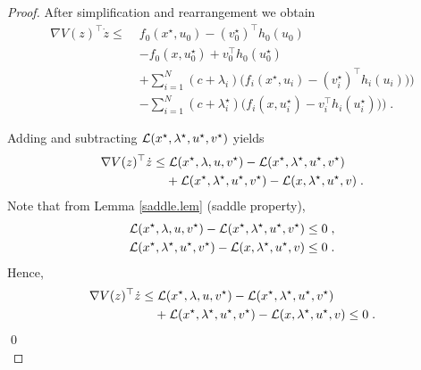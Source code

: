 \documentclass[journal,twoside,web]{ieeecolor}
\begin{document}
\begin{proof}
After simplification and rearrangement we obtain
\begin{align*}
\nabla V(z)^\top \dot z\leq \; & f_0(x^\star,u_0)-(v_0^\star)^\top
h_0(u_0)\\
&-f_0(x,u_0^\star)+v_0^\top h_0(u_0^\star)\\
&+\sum_{i=1}^N(c+\lambda_i) \Big(f_i(x^\star,u_i)-(v_i^\star)^\top h_i(u_i))\Big)\\
&-\sum_{i=1}^N(c+\lambda_i^\star) \Big(f_i(x,u_i^\star)-v_i^\top h_i(u_i^\star))\Big)\;.
\end{align*}

Adding and subtracting ${\cal L}(x^\star,\lambda^\star,u^\star,v^\star)$ yields
\begin{align} \label{deriv_v}
\nabla V(z)^\top \dot z\leq&\; {\cal L}(x^\star,\lambda,u,v^\star)-{\cal L}(x^\star,\lambda^\star,u^\star,v^\star)\\
&+{\cal L}(x^\star,\lambda^\star,u^\star,v^\star)-{\cal L}(x,\lambda^\star,u^\star,v) \;.\nonumber
\end{align}
Note that from Lemma \ref{saddle.lem} (saddle property),
\begin{align*}{\cal L}(x^\star,\lambda,u,v^\star)-{\cal L}(x^\star,\lambda^\star,u^\star,v^\star)\leq 0\;,
\\
{\cal L}(x^\star,\lambda^\star,u^\star,v^\star)-{\cal L}(x,\lambda^\star,u^\star,v)\leq 0\;.
\end{align*}
Hence,
\begin{align} \label{deriv_v2}
\nabla V(z)^\top \dot z\leq&\; {\cal L}(x^\star,\lambda,u,v^\star)-{\cal L}(x^\star,\lambda^\star,u^\star,v^\star)\\
&+{\cal L}(x^\star,\lambda^\star,u^\star,v^\star)-{\cal L}(x,\lambda^\star,u^\star,v)\leq 0 \;.\nonumber
\end{align}
\qed\\
\end{proof}
\end{document}
